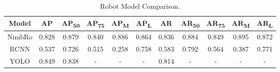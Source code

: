 \begin{longtable}{|c|c|c|c|c|c|c|c|c|c|c|}
  \caption{Robot Model Comparison.}
  \label{tb:robotmodelcomparison}\\
  \hline
  \rowcolor[HTML]{C0C0C0}
  \textbf{Model} & \textbf{AP} & \textbf{AP\textsubscript{50}} & \textbf{AP\textsubscript{75}} & \textbf{AP\textsubscript{M}} & \textbf{AP\textsubscript{L}} & \textbf{AR} & \textbf{AR\textsubscript{50}} & \textbf{AR\textsubscript{75}} & \textbf{AR\textsubscript{M}} & \textbf{AR\textsubscript{L}} \\
  \hline
  NimbRo         & 0.828       & 0.879                         & 0.840                         & 0.886                        & 0.864                        & 0.836       & 0.884                         & 0.849                         & 0.895                        & 0.872 \\
  \hline                        
  RCNN           & 0.537       & 0.726                         & 0.515                         & 0.258                        & 0.758                        & 0.583       & 0.792                         & 0.564                         & 0.387                        & 0.771 \\
  \hline                        
  YOLO           & 0.849       & 0.838                         & -                             & -                            & -                            & 0.814       & -                             & -                             & -                            & - \\
  \hline
\end{longtable}

